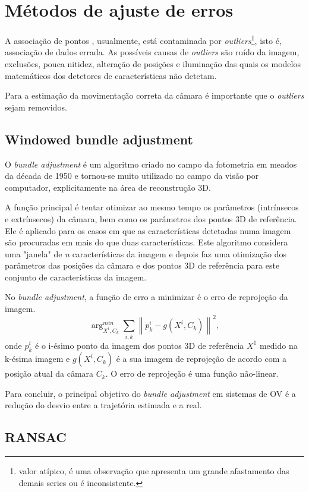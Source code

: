 \section{Métodos de ajuste de erros}

A associação de pontos , usualmente, está contaminada por \textit{outliers}\footnote{valor atípico, é uma observação que apresenta um grande afastamento das demais series ou é inconsistente.}, isto é, associação de dados errada. As possíveis causas de \textit{outliers} são ruído da imagem, exclusões, pouca nitidez, alteração de posições e iluminação das quais os modelos matemáticos dos detetores de características não detetam. 

Para  a estimação da movimentação correta da câmara é importante que o \textit{outliers} sejam removidos. 

\subsection{Windowed bundle adjustment}

O \textit{bundle adjustment} é um algoritmo criado no campo da fotometria em meados da década de 1950 e tornou-se muito utilizado no campo da visão por computador, explicitamente na área de reconstrução 3D.

A função principal é tentar otimizar ao mesmo tempo os parâmetros (intrínsecos e extrínsecos) da câmara, bem como os parâmetros dos pontos 3D de referência. Ele é aplicado para os casos em que as características detetadas numa imagem são procuradas em mais do que duas características. Este algoritmo considera uma "janela" de \textit{n} características da imagem e depois faz uma otimização dos parâmetros das posições da câmara e dos pontos 3D de referência para este conjunto de características da imagem.

No \textit{bundle adjustment}, a função de erro a minimizar é o erro de reprojeção da imagem. 
\[ \arg_{X^i,C_k}^{min} \sum_{i,k}{\left \| p_k^i - g(X^i ,C_k) \right \|}^2 ,\]
onde $p_k^i$ é o i-ésimo ponto da imagem dos pontos 3D de referência \textit{$X^1$} medido na k-ésima imagem e $\textit{g}(X^i,C_k)$ é a sua imagem de reprojeção de acordo com a posição atual da câmara $C_k$. O erro de reprojeção é uma função não-linear.

Para concluir, o principal objetivo do \textit{bundle adjustment} em sistemas de OV é a redução do desvio entre a trajetória estimada e a real.

\subsection{RANSAC}


